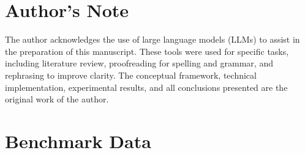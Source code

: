 \documentclass[runningheads]{llncs}
\begin{document}
\section*{Author's Note}
The author acknowledges the use of large language models (LLMs) to assist in the preparation of this manuscript. These tools were used for specific tasks, including literature review, proofreading for spelling and grammar, and rephrasing to improve clarity. The conceptual framework, technical implementation, experimental results, and all conclusions presented are the original work of the author.


\appendix
\section{Benchmark Data}
\label{sec:appendix_benchmark}
\end{document}
